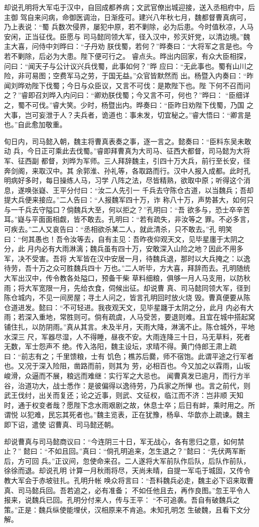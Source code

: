 却说孔明将大军屯于汉中，自回成都养病；文武官僚出城迎接，送入丞相府中，后主御
驾自来问病，命御医调治，日渐痊可。建兴八年秋七月，魏都督曹真病可，乃上表说：“蜀
兵数次侵界，屡犯中原，若不剿除，必为后患。今时值秋凉，人马安闲，正当征伐。臣愿与
司马懿同领大军，径入汉中，殄灭奸党，以清边境。”魏主大喜，问侍中刘晔曰：“子丹劝
朕伐蜀，若何？”晔奏曰：“大将军之言是也。今若不剿除，后必为大患。陛下便可行之。
睿点头。晔出内回家，有众大臣相探，问曰：“闻天子与公计议兴兵伐蜀，此事如何？”晔
应曰：“无此事也。蜀有山川之险，非可易图；空费军马之劳，于国无益。”众官皆默然而
出。杨暨入内奏曰：“昨闻刘晔劝陛下伐蜀；今日与众臣议，又言不可伐：是欺陛下也。陛
下何不召而问之？”睿即召刘晔入内问曰：“卿劝朕伐蜀；今又言不可，何也？”晔曰：
“臣细详之，蜀不可伐。”睿大笑。少时，杨暨出内。晔奏曰：“臣昨日劝陛下伐蜀，乃国
之大事，岂可妄泄于人？夫兵者，诡道也：事未发，切宜秘之。”睿大悟曰：“卿言是
也。”自此愈加敬重。

旬日内，司马懿入朝，魏主将曹真表奏之事，逐一言之。懿奏曰：“臣料东吴未敢动
兵，今日正可乘此去伐蜀。”睿即拜曹真为大司马、征西大都督，司马懿为大将军、征西副
都督，刘晔为军师。三人拜辞魏主，引四十万大兵，前行至长安，径奔剑阁，来取汉中。其
余郭淮、孙礼等，各取路而行。汉中人报入成都。此时孔明病好多时，每日操练人马，习学
八阵之法，尽皆精熟，欲取中原；听得这个消息，遂唤张嶷、王平分付曰：“汝二人先引一
千兵去守陈仓古道，以当魏兵；吾却提大兵便来接应。”二人告曰：“人报魏军四十万，诈
称八十万，声势甚大，如何只与一千兵去守隘口？倘魏兵大至，何以拒之？”孔明曰：“吾
欲多与，恐士卒辛苦耳。”嶷与平面面相觑，皆不敢去。孔明曰：“若有疏失，非汝等之
罪。不必多言，可疾去。”二人又哀告曰：“丞相欲杀某二人，就此清杀，只不敢去。”孔
明笑曰：“何其愚也！吾令汝等去，自有主见：吾昨夜仰观天文，见毕星廛于太阴之分，此
月内必有大雨淋漓；魏兵虽有四十万，安敢深入山险之地？因此不用多军，决不受害。吾将
大军皆在汉中安居一月，待魏兵退，那时以大兵掩之：以逸待劳，吾十万之众可胜魏兵四十
万也。”二人听毕，方大喜，拜辞而去。孔明随统大军出汉中，传令教各处隘口，预备干柴
草料细粮，俱够一月人马支用，以防秋雨；将大军宽限一月，先给衣食，伺候出征。却说曹
真、司马懿同领大军，径到陈仓城内，不见一间房屋；寻土人问之，皆言孔明回时放火烧
毁。曹真便要从陈仓道进发。懿曰：“不可轻进。我夜观天文，见毕星躔于太阴之分，此月
内必有大雨；若深入重地，常胜则可。倘有疏虞，人马受苦，要退则难。且宜在城中搭起窝
铺住扎，以防阴雨。”真从其言。未及半月，天雨大降，淋漓不止。陈仓城外，平地水深三
尺，军器尽湿，人不得睡，昼夜不安。大雨连降三十日，马无草料，死者无数，军士怨声不
绝。传入洛阳，魏主设坛，求晴不得。黄门侍郎王肃上疏曰：“前志有之；千里馈粮，士有
饥色；樵苏后爨，师不宿饱。此谓平途之行军者也。又况于深入险阻，凿路而前，则其为
劳，必相百也。今又加之以霖雨，山坂峻滑，众逼而不展，粮远而难继：实行军之大忌也。
闻曹真发已逾月，而行方半谷，治道功大，战士悉作：是彼偏得以逸待劳，乃兵家之所惮
也。言之前代，则武王伐纣，出关而复还；论之近事，则武、文征权，临江而不济：岂非顺
天知时，通于权变者哉？愿陛下念水雨艰剧之故，休息士卒；后日有衅，乘时用之。所谓悦
以犯难，民忘其死者也。”魏主览表，正在犹豫，杨阜、华歆亦上疏谏。魏主即下诏，遣使
诏曹真、司马懿还朝。

却说曹真与司马懿商议曰：“今连阴三十日，军无战心，各有思归之意，如何禁止？”
懿曰：“不如且回。”真曰：“倘孔明追来，怎生退之？”懿曰：“先伏两军断后，方可回
兵。”正议间，忽使命来召。二人遂将大军前队作后队，后队作前队，徐徐而退。却说孔明
计算一月秋雨将尽，天尚未晴，自提一军屯于城固，又传令教大军会于赤坡驻扎。孔明升帐
唤众将言曰：“吾料魏兵必走，魏主必下诏来取曹真、司马懿兵回。吾若追之，必有准备；
不如任他且去，再作良图。”忽王平令人报来，说魏兵已回。孔明分付来人，传与王平：
“不可追袭。吾自有破魏兵之策。”正是：魏兵纵使能埋伏，汉相原来不肯追。未知孔明怎
生破魏，且看下文分解。